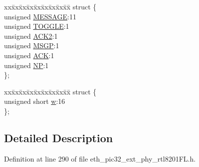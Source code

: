 \begin{DoxyCompactItemize}
\begin{tabbing}
\end{tabbing}\item 
\begin{tabbing}
xx\=xx\=xx\=xx\=xx\=xx\=xx\=xx\=xx\=\kill
struct \{\\
\>unsigned \hyperlink{union_____a_n_l_p_r_n_pbits__t_a06361005f0d2faefe34e0bdb1499bfe7}{MESSAGE}:11\\
\>unsigned \hyperlink{union_____a_n_l_p_r_n_pbits__t_ab4110904eded0b4b6a2280a6b4b9f4c2}{TOGGLE}:1\\
\>unsigned \hyperlink{union_____a_n_l_p_r_n_pbits__t_a04eefaff71d440a3996c7db3676475ba}{ACK2}:1\\
\>unsigned \hyperlink{union_____a_n_l_p_r_n_pbits__t_a8c958300dd9e82d064f59696a78d8e45}{MSGP}:1\\
\>unsigned \hyperlink{union_____a_n_l_p_r_n_pbits__t_a9d5913829bb2b681dc6257fc7e9b7a56}{ACK}:1\\
\>unsigned \hyperlink{union_____a_n_l_p_r_n_pbits__t_ac89729be1dc289730931f8238a316516}{NP}:1\\
\}; \\

\end{tabbing}\item 
\begin{tabbing}
xx\=xx\=xx\=xx\=xx\=xx\=xx\=xx\=xx\=\kill
struct \{\\
\>unsigned short \hyperlink{union_____a_n_l_p_r_n_pbits__t_a160850a4684a3e82c2323033964f2e98}{w}:16\\
\}; \\

\end{tabbing}\end{DoxyCompactItemize}


\subsection{Detailed Description}


Definition at line 290 of file eth\+\_\+pic32\+\_\+ext\+\_\+phy\+\_\+rtl8201\+F\+L.\+h.



